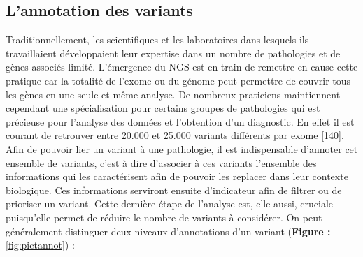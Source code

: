 \documentclass[12pt,twoside]{reedthesis}
\theoremstyle{definition}
\theoremstyle{definition}
\theoremstyle{remark}
\begin{document}
  \newpage
  
  \subsection{L'annotation des variants}\label{lannotation-des-variants}
  
  Traditionnellement, les scientifiques et les laboratoires dans lesquels
  ils travaillaient développaient leur expertise dans un nombre de
  pathologies et de gènes associés limité. L'émergence du NGS est en train
  de remettre en cause cette pratique car la totalité de l'exome ou du
  génome peut permettre de couvrir tous les gènes en une seule et même
  analyse. De nombreux praticiens maintiennent cependant une
  spécialisation pour certains groupes de pathologies qui est précieuse
  pour l'analyse des données et l'obtention d'un diagnostic. En effet il
  est courant de retrouver entre 20.000 et 25.000 variants différents par
  exome {[}\protect\hyperlink{ref-Gonzaga-Jauregui2012}{140}{]}. Afin de
  pouvoir lier un variant à une pathologie, il est indispensable d'annoter
  cet ensemble de variants, c'est à dire d'associer à ces variants
  l'ensemble des informations qui les caractérisent afin de pouvoir les
  replacer dans leur contexte biologique. Ces informations serviront
  ensuite d'indicateur afin de filtrer ou de prioriser un variant. Cette
  dernière étape de l'analyse est, elle aussi, cruciale puisqu'elle permet
  de réduire le nombre de variants à considérer. On peut généralement
  distinguer deux niveaux d'annotations d'un variant (\textbf{Figure :}
  \ref{fig:pictannot}) :
  
\end{document}
